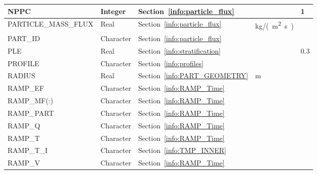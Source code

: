 \documentclass[11pt]{book}
\begin{document}
\begin{longtable}{@{\extracolsep{\fill}}|l|l|l|l|l|}
{\ct NPPC}                              & Integer         & Section~\ref{info:particle_flux}          &                     & 1                       \\ \hline
{\ct PARTICLE\_MASS\_FLUX}              & Real            & Section~\ref{info:particle_flux}          & \si{kg/(m^2.s)}     &                         \\ \hline
{\ct PART\_ID}                          & Character       & Section~\ref{info:particle_flux}          &                     &                         \\ \hline
{\ct PLE}                               & Real            & Section~\ref{info:stratification}         &                     & 0.3                     \\ \hline
{\ct PROFILE}                           & Character       & Section~\ref{info:profiles}               &                     &                         \\ \hline
{\ct RADIUS}                            & Real            & Section~\ref{info:PART_GEOMETRY}          & m                   &                         \\ \hline
{\ct RAMP\_EF}                          & Character       & Section~\ref{info:RAMP_Time}              &                     &                         \\ \hline
{\ct RAMP\_MF(:)}                       & Character       & Section~\ref{info:RAMP_Time}              &                     &                         \\ \hline
{\ct RAMP\_PART}                        & Character       & Section~\ref{info:RAMP_Time}              &                     &                         \\ \hline
{\ct RAMP\_Q}                           & Character       & Section~\ref{info:RAMP_Time}              &                     &                         \\ \hline
{\ct RAMP\_T}                           & Character       & Section~\ref{info:RAMP_Time}              &                     &                         \\ \hline
{\ct RAMP\_T\_I}                        & Character       & Section~\ref{info:TMP_INNER}              &                     &                         \\ \hline
{\ct RAMP\_V}                           & Character       & Section~\ref{info:RAMP_Time}              &                     &                         \\ \hline

\end{longtable}
\end{document}
